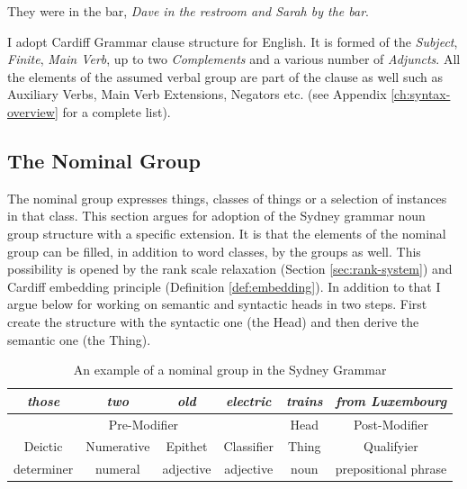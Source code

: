 \begin{exe}
	\ex\label{ex:elipted-clause} They were in the bar, \textit{Dave in the restroom and Sarah by the bar}.
\end{exe}

I adopt Cardiff Grammar clause structure for English. It is formed of the \textit{Subject}, \textit{Finite}, \textit{Main Verb}, up to two \textit{Complements} and a various number of \textit{Adjuncts}. All the elements of the assumed verbal group are part of the clause as well such as Auxiliary Verbs, Main Verb Extensions, Negators etc. (see Appendix \ref{ch:syntax-overview} for a 
complete list).




\subsection{The Nominal Group}
\label{sec:nominal-group}

The nominal group expresses things, classes of things or a selection of instances in that class. This section argues for adoption of the Sydney grammar noun group structure with a specific extension. It is that the elements of the nominal group can be filled, in addition to word classes, by the groups as well. This possibility is opened by the rank scale relaxation (Section \ref{sec:rank-system}) and Cardiff embedding principle (Definition \ref{def:embedding}). In addition to that I argue below for working on semantic and syntactic heads in two steps. First create the structure with the syntactic one (the Head) and then derive the semantic one (the Thing).

\begin{table}[!ht]
    \centering
	\begin{tabular}{|c|c|c|c|c|c|}
		\hline
		\textit{those} & \textit{two} & \textit{old} & \textit{electric} & \textit{trains} & \textit{from Luxembourg} \\ \hline
		\multicolumn{4}{|c|}{Pre-Modifier}                               & Head            & Post-Modifier            \\ \hline
		Deictic        & Numerative   & Epithet      & Classifier        & Thing           & Qualifyier               \\ \hline
		determiner     & numeral      & adjective    & adjective         & noun            & prepositional phrase     \\ \hline
	\end{tabular}
	\caption{An example of a nominal group in the Sydney Grammar \citep[264]{Halliday2013}}
	\label{tab:example-ng}
\end{table}

